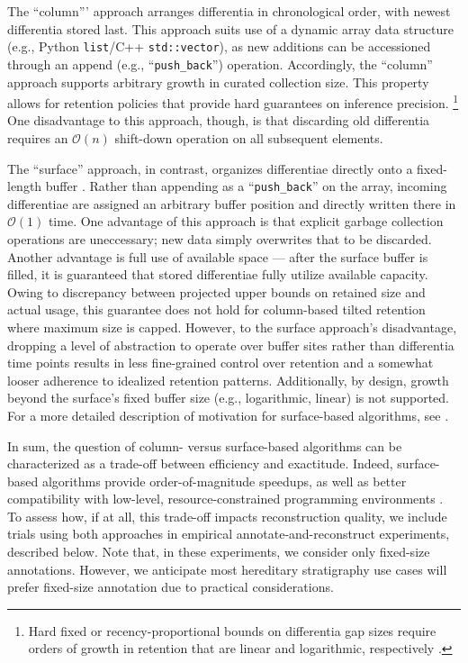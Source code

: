 The ``column''' approach arranges differentia in chronological order, with newest differentia stored last.
This approach suits use of a dynamic array data structure (e.g., Python \texttt{list}/C++ \texttt{std::vector}), as new additions can be accessioned through an append (e.g., ``\texttt{push\_back}'') operation.
Accordingly, the ``column'' approach supports arbitrary growth in curated collection size.
This property allows for retention policies that provide hard guarantees on inference precision.
\footnote{%
Hard fixed or recency-proportional bounds on differentia gap sizes require orders of growth in retention that are linear and logarithmic, respectively \citep{moreno2024algorithms}.
}
One disadvantage to this approach, though, is that discarding old differentia requires an $\mathcal{O}(n)$ shift-down operation on all subsequent elements.

The ``surface'' approach, in contrast, organizes differentiae directly onto a fixed-length buffer \citep{moreno2024structured}.
Rather than appending as a ``\texttt{push\_back}'' on the array, incoming differentiae are assigned an arbitrary buffer position and directly written there in $\mathcal{O}(1)$ time.
One advantage of this approach is that explicit garbage collection operations are uneccessary; new data simply overwrites that to be discarded.
Another advantage is full use of available space --- after the surface buffer is filled, it is guaranteed that stored differentiae fully utilize available capacity.
Owing to discrepancy between projected upper bounds on retained size and actual usage, this guarantee does not hold for column-based tilted retention where maximum size is capped.
However, to the surface approach's disadvantage, dropping a level of abstraction to operate over buffer sites rather than differentia time points results in less fine-grained control over retention and a somewhat looser adherence to idealized retention patterns.
Additionally, by design, growth beyond the surface's fixed buffer size (e.g., logarithmic, linear) is not supported.
For a more detailed description of motivation for surface-based algorithms, see \citep{moreno2024trackable}.

In sum, the question of column- versus surface-based algorithms can be characterized as a trade-off between efficiency and exactitude.
Indeed, surface-based algorithms provide order-of-magnitude speedups, as well as better compatibility with low-level, resource-constrained programming environments \citep{moreno2024trackable}.
To assess how, if at all, this trade-off impacts reconstruction quality, we include trials using both approaches in empirical annotate-and-reconstruct experiments, described below.
Note that, in these experiments, we consider only fixed-size annotations.
However, we anticipate most hereditary stratigraphy use cases will prefer fixed-size annotation due to practical considerations.

